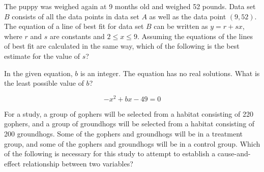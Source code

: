 \begin{center}
\end{center}




The puppy was weighed again at 9 months old and weighed 52 pounds.  
Data set $B$ consists of all the data points in data set $A$ as well as the data point $(9, 52)$.  
The equation of a line of best fit for data set $B$ can be written as $y = r + sx$,  
where $r$ and $s$ are constants and $2 \leq x \leq 9$.  
Assuming the equations of the lines of best fit are calculated in the same way,  
which of the following is the best estimate for the value of $s$?

\vspace{0.75em}


\vspace{2em}
\newpage

\noindent\markforreview
\vspace{1em}

In the given equation, $b$ is an integer. The equation has no real solutions.  
What is the least possible value of $b$?

\[
-x^2 + bx - 49 = 0
\]

\vspace{2em}
\newpage

\noindent\markforreview
\vspace{1em}

For a study, a group of gophers will be selected from a habitat consisting of 220 gophers, and a group of groundhogs will be selected from a habitat consisting of 200 groundhogs. Some of the gophers and groundhogs will be in a treatment group, and some of the gophers and groundhogs will be in a control group. Which of the following is necessary for this study to attempt to establish a cause-and-effect relationship between two variables?

